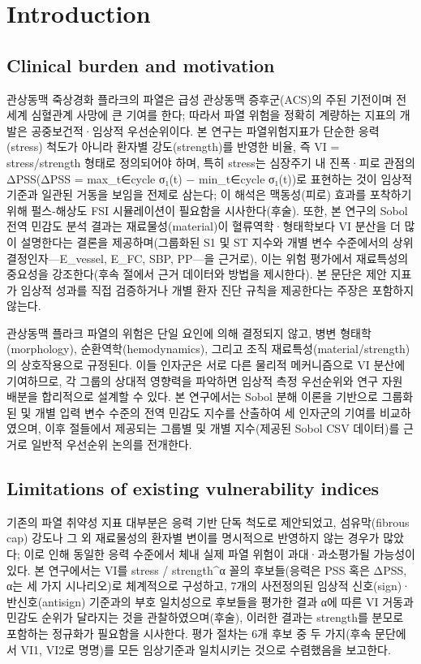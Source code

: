\documentclass[preprint,12pt]{elsarticle}
\begin{document}
\section{Introduction}

\subsection{Clinical burden and motivation}
관상동맥 죽상경화 플라크의 파열은 급성 관상동맥 증후군(ACS)의 주된 기전이며 전 세계 심혈관계 사망에 큰 기여를 한다; 따라서 파열 위험을 정확히 계량하는 지표의 개발은 공중보건적·임상적 우선순위이다. 본 연구는 파열위험지표가 단순한 응력(stress) 척도가 아니라 환자별 강도(strength)를 반영한 비율, 즉 VI = stress/strength 형태로 정의되어야 하며, 특히 stress는 심장주기 내 진폭·피로 관점의 ΔPSS(ΔPSS = max\_{t∈cycle} σ₁(t) − min\_{t∈cycle} σ₁(t))로 표현하는 것이 임상적 기준과 일관된 거동을 보임을 전제로 삼는다; 이 해석은 맥동성(피로) 효과를 포착하기 위해 펄스-해상도 FSI 시뮬레이션이 필요함을 시사한다(후술). 또한, 본 연구의 Sobol 전역 민감도 분석 결과는 재료물성(material)이 혈류역학·형태학보다 VI 분산을 더 많이 설명한다는 결론을 제공하며(그룹화된 S1 및 ST 지수와 개별 변수 수준에서의 상위 결정인자—E\_vessel, E\_FC, SBP, PP—을 근거로), 이는 위험 평가에서 재료특성의 중요성을 강조한다(후속 절에서 근거 데이터와 방법을 제시한다). 본 문단은 제안 지표가 임상적 성과를 직접 검증하거나 개별 환자 진단 규칙을 제공한다는 주장은 포함하지 않는다.

관상동맥 플라크 파열의 위험은 단일 요인에 의해 결정되지 않고, 병변 형태학(morphology), 순환역학(hemodynamics), 그리고 조직 재료특성(material/strength)의 상호작용으로 규정된다. 이들 인자군은 서로 다른 물리적 메커니즘으로 VI 분산에 기여하므로, 각 그룹의 상대적 영향력을 파악하면 임상적 측정 우선순위와 연구 자원 배분을 합리적으로 설계할 수 있다. 본 연구에서는 Sobol 분해 이론을 기반으로 그룹화된 및 개별 입력 변수 수준의 전역 민감도 지수를 산출하여 세 인자군의 기여를 비교하였으며, 이후 절들에서 제공되는 그룹별 및 개별 지수(제공된 Sobol CSV 데이터)를 근거로 일반적 우선순위 논의를 전개한다.

\subsection{Limitations of existing vulnerability indices}
기존의 파열 취약성 지표 대부분은 응력 기반 단독 척도로 제안되었고, 섬유막(fibrous cap) 강도나 그 외 재료물성의 환자별 변이를 명시적으로 반영하지 않는 경우가 많았다; 이로 인해 동일한 응력 수준에서 체내 실제 파열 위험이 과대·과소평가될 가능성이 있다. 본 연구에서는 VI를 stress / strength\textasciicircum {α} 꼴의 후보들(응력은 PSS 혹은 ΔPSS, α는 세 가지 시나리오)로 체계적으로 구성하고, 7개의 사전정의된 임상적 신호(sign)·반신호(antisign) 기준과의 부호 일치성으로 후보들을 평가한 결과 α에 따른 VI 거동과 민감도 순위가 달라지는 것을 관찰하였으며(후술), 이러한 결과는 strength를 분모로 포함하는 정규화가 필요함을 시사한다. 평가 절차는 6개 후보 중 두 가지(후속 문단에서 VI1, VI2로 명명)를 모든 임상기준과 일치시키는 것으로 수렴했음을 보고한다.
\end{document}
